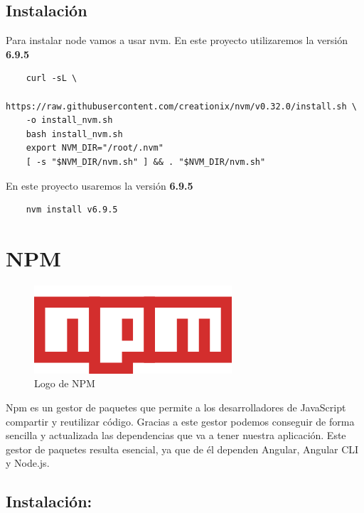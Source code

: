\documentclass[openright,twoside,10pt]{book}
\begin{document}
    \subsection{Instalación}\label{instalaciuxf3n}
    
    Para instalar node vamos a usar nvm. En este proyecto utilizaremos la
    versión \textbf{6.9.5}
    
    \begin{verbatim}
    curl -sL \
    https://raw.githubusercontent.com/creationix/nvm/v0.32.0/install.sh \
    -o install_nvm.sh
    bash install_nvm.sh
    export NVM_DIR="/root/.nvm"
    [ -s "$NVM_DIR/nvm.sh" ] && . "$NVM_DIR/nvm.sh"
    \end{verbatim}
    
    En este proyecto usaremos la versión \textbf{6.9.5}
    
    \begin{verbatim}
    nvm install v6.9.5
    \end{verbatim}
    
    \section{NPM}\label{npm}
    
    \begin{figure}[H]
        \begin{center}
            \includegraphics[scale=0.8]{img/npm.png}
        \end{center}
        \caption{Logo de NPM}
    \end{figure}
    
    Npm es un gestor de paquetes que permite a los desarrolladores de
    JavaScript compartir y reutilizar código. Gracias a este gestor podemos
    conseguir de forma sencilla y actualizada las dependencias que va a
    tener nuestra aplicación. Este gestor de paquetes resulta esencial, ya
    que de él dependen Angular, Angular CLI y Node.js.
    
    \subsection{Instalación:}\label{instalaciuxf3n-1}
    
\end{document}
